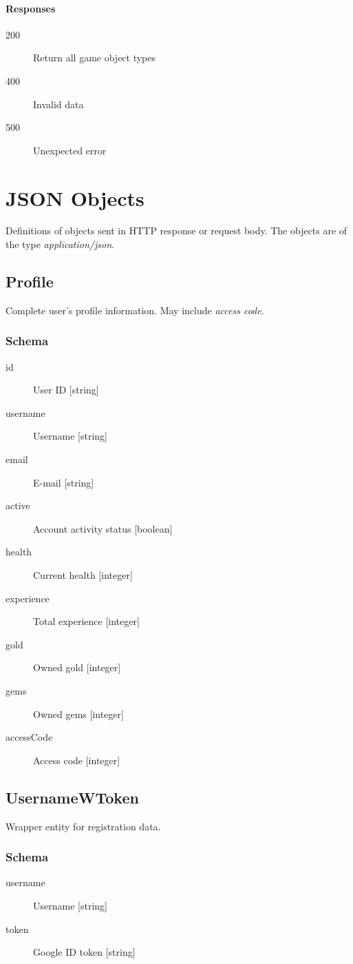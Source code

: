 		\paragraph*{Responses}
			\begin{description}		
				\item[200] Return all game object types
				\item[400] Invalid data
				\item[500] Unexpected error
			\end{description}			
				

\section{JSON Objects}
Definitions of objects sent in HTTP response or request body. The objects are of the type \textit{application/json}.
	\subsection{Profile}
		\label{json:profile}
		Complete user's profile information. May include \textit{access code}.
		\subsubsection{Schema}	
			\begin{description}
				\item[id] User ID [string]
				\item[username] Username [string]
				\item[email] E-mail [string]
				\item[active] Account activity status [boolean]
				\item[health] Current health [integer]
				\item[experience] Total experience [integer]
				\item[gold] Owned gold [integer]
				\item[gems] Owned gems [integer]
				\item[accessCode] Access code [integer]
			\end{description}

	\subsection{UsernameWToken}
		\label{json:usernamewtoken}
		Wrapper entity for registration data.
		\subsubsection{Schema}
			\begin{description}
				\item[username] Username [string]
				\item[token] Google ID token [string]
			\end{description}

